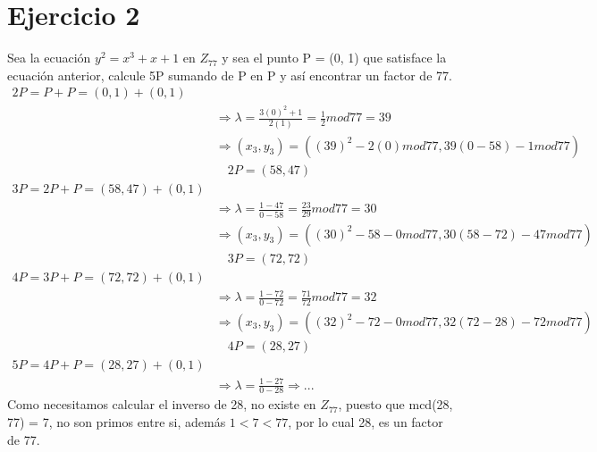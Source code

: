 \documentclass[12pt, letterpaper]{article}
\begin{document}
\section*{Ejercicio 2}
Sea la ecuación $y^2 = x^3 + x + 1$ en $Z_{77}$ y sea el punto P = (0, 1) que satisface la ecuación anterior, calcule 5P sumando de P en P y así encontrar un factor de 77.
\begin{equation*}
\begin{split}
2P = P + P = (0, 1) + (0, 1)\\
&\Rightarrow \lambda = \frac{3(0)^2 + 1}{2(1)} = \frac{1}{2} mod 77 = 39\\
&\Rightarrow (x_3, y_3) = ((39)^2-2(0) mod 77, 39(0-58)-1 mod 77)\\
&\quad 2P = (58, 47)\\
3P = 2P + P = (58, 47) + (0, 1)\\
&\Rightarrow \lambda = \frac{1-47}{0-58} = \frac{23}{29} mod 77 = 30\\
&\Rightarrow (x_3, y_3) = ((30)^2-58-0 mod 77, 30(58-72)-47 mod 77)\\
&\quad 3P = (72, 72)\\
4P = 3P + P = (72, 72) + (0, 1)\\
&\Rightarrow \lambda = \frac{1-72}{0-72} = \frac{71}{72} mod 77 = 32\\
&\Rightarrow (x_3, y_3) = ((32)^2-72-0 mod 77, 32(72-28)-72 mod 77)\\
&\quad 4P = (28, 27)\\
5P = 4P + P = (28, 27) + (0, 1)\\
&\Rightarrow \lambda = \frac{1-27}{0-28} \Rightarrow ...
\end{split}
\end{equation*}
Como necesitamos calcular el inverso de 28, no existe en $Z_{77}$, puesto que mcd(28, 77) = 7, no son primos entre si, además $1 < 7 < 77$, por lo cual 28, es un factor de 77.
\end{document}
